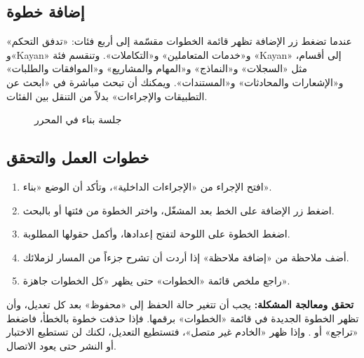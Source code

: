 \subsection{إضافة خطوة}

عندما تضغط زر الإضافة تظهر قائمة الخطوات مقسّمة إلى أربع فئات: «تدفق التحكم» و«Kayan» و«خدمات المتعاملين» و«التكاملات». وتنقسم فئة «Kayan» إلى أقسام، مثل «السجلات» و«النماذج» و«المهام والمشاريع» و«الموافقات والطلبات» و«الإشعارات والمحادثات» و«المستندات». ويمكنك أن تبحث مباشرة في «ابحث عن التطبيقات والإجراءات» بدلاً من التنقل بين الفئات.

\begin{figure}[H]
\centering
{}
\rclegend
\caption{جلسة بناء في المحرر}
\label{fig:builder-isop-editor-flow}
\end{figure}

\subsection{خطوات العمل والتحقق}
\begin{enumerate}
\item افتح الإجراء من «الإجراءات الداخلية»، وتأكد أن الوضع «بناء».
\item اضغط زر الإضافة على الخط بعد المشغّل، واختر الخطوة من فئتها أو بالبحث.
\item اضغط الخطوة على اللوحة لتفتح إعدادها، وأكمل حقولها المطلوبة.
\item أضف ملاحظة من «إضافة ملاحظة» إذا أردت أن تشرح جزءاً من المسار لزملائك.
\item راجع ملخص قائمة «الخطوات» حتى يظهر «كل الخطوات جاهزة».
\end{enumerate}

\textbf{تحقق ومعالجة المشكلة:} يجب أن تتغير حالة الحفظ إلى «محفوظ» بعد كل تعديل، وأن تظهر الخطوة الجديدة في قائمة «الخطوات» برقمها. فإذا حذفت خطوة بالخطأ، فاضغط «تراجع» أو . وإذا ظهر «الخادم غير متصل»، فتستطيع التعديل، لكنك لن تستطيع الاختبار أو النشر حتى يعود الاتصال.

